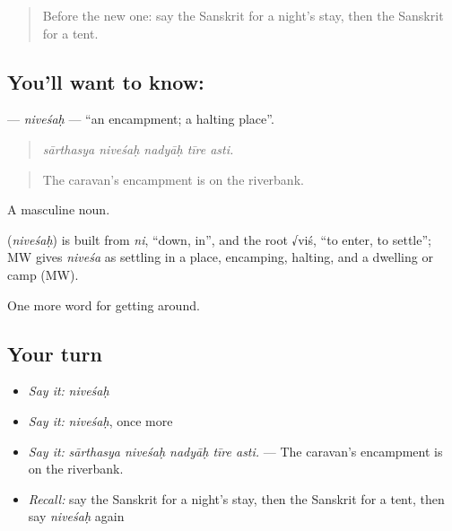 \label{lesson:SA-C427-nivesah}



\begin{quote}
Before the new one: say the Sanskrit for a night's stay, then the Sanskrit for a tent.
\end{quote}

\subsection*{You'll want to know: }
\textbf{} — \emph{niveśaḥ} — \textquotedblleft{}an encampment; a halting place\textquotedblright{}.

\begin{quote}
    
\end{quote}

\begin{quote}
\emph{sārthasya niveśaḥ nadyāḥ tīre asti.}
\end{quote}

\begin{quote}
The caravan's encampment is on the riverbank.
\end{quote}

A masculine noun.

\begin{cousinweb}
\textbf{} (\emph{niveśaḥ}) is built from \emph{ni}, \textquotedblleft{}down, in\textquotedblright{}, and the root √viś, \textquotedblleft{}to enter, to settle\textquotedblright{}; MW gives \emph{niveśa} as settling in a place, encamping, halting, and a dwelling or camp (MW).
\end{cousinweb}

\begin{grammarlens}[title={What you've built}]
One more word for getting around.
\end{grammarlens}

\subsection*{Your turn}
\begin{itemize}
\raggedright
  \item \emph{Say it:} \emph{niveśaḥ}
  \item \emph{Say it:} \emph{niveśaḥ}, once more
  \item \emph{Say it:} \emph{sārthasya niveśaḥ nadyāḥ tīre asti.} — The caravan's encampment is on the riverbank.
  \item \emph{Recall:} say the Sanskrit for a night's stay, then the Sanskrit for a tent, then say \emph{niveśaḥ} again
\end{itemize}

